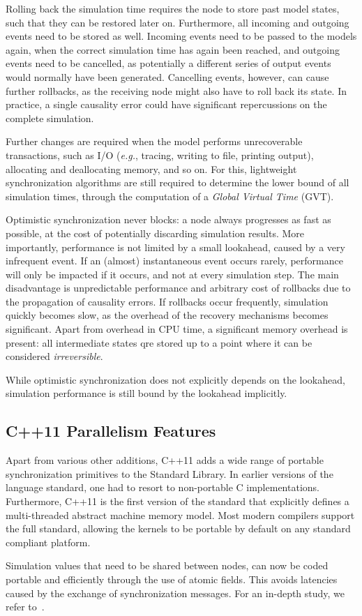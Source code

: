 Rolling back the simulation time requires the node to store past model states, such that they can be restored later on.
Furthermore, all incoming and outgoing events need to be stored as well.
Incoming events need to be passed to the models again, when the correct simulation time has again been reached, and outgoing events need to be cancelled, as potentially a different series of output events would normally have been generated.
Cancelling events, however, can cause further rollbacks, as the receiving node might also have to roll back its state.
In practice, a single causality error could have significant repercussions on the complete simulation.

Further changes are required when the model performs unrecoverable transactions, such as I/O (\textit{e.g.}, tracing, writing to file, printing output), allocating and deallocating memory, and so on.
For this, lightweight synchronization algorithms are still required to determine the lower bound of all simulation times, through the computation of a \textit{Global Virtual Time} (GVT).

Optimistic synchronization never blocks: a node always progresses as fast as possible, at the cost of potentially discarding simulation results.
More importantly, performance is not limited by a small lookahead, caused by a very infrequent event.
If an (almost) instantaneous event occurs rarely, performance will only be impacted if it occurs, and not at every simulation step.
The main disadvantage is unpredictable performance and arbitrary cost of rollbacks due to the propagation of causality errors.
If rollbacks occur frequently, simulation quickly becomes slow, as the overhead of the recovery mechanisms becomes significant.
Apart from overhead in CPU time, a significant memory overhead is present: all intermediate states qre stored up to a point where it can be considered \textit{irreversible}.

While optimistic synchronization does not explicitly depends on the lookahead, simulation performance is still bound by the lookahead implicitly.

\subsection{C++11 Parallelism Features}
Apart from various other additions, C++11 adds a wide range of portable synchronization primitives to the Standard Library.
In earlier versions of the language standard, one had to resort to non-portable C implementations.
Furthermore, C++11 is the first version of the standard that explicitly defines a multi-threaded abstract machine memory model.
Most modern compilers support the full standard, allowing the kernels to be portable by default on any standard compliant platform. 

Simulation values that need to be shared between nodes, can now be coded portable and efficiently through the use of atomic fields.
This avoids latencies caused by the exchange of synchronization messages.
For an in-depth study, we refer to~\cite{CPE:CPE3007}.
